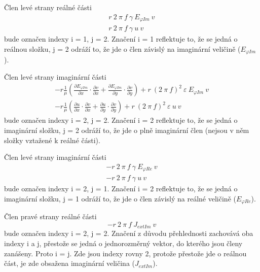 \documentclass[12pt,a4paper,oneside]{article}
\numberwithin{equation}{section} %
\numberwithin{figure}{section} %
\numberwithin{table}{section} %
\begin{document}
Člen levé strany reálné části
\begin{subequations}
\begin{gather}
r ~ 2 ~ \pi ~ f ~ \gamma ~ E _{\varphi Im} ~ v
\\
r ~ 2 ~ \pi ~ f ~ \gamma ~ u ~ v
\end{gather}
\end{subequations}
bude označen indexy i = 1, j = 2. Značení i = 1 reflektuje to, že se jedná o reálnou složku, j = 2 odráží to, že jde o člen závislý na imaginární veličině ($E _{\varphi Im}$).


Člen levé strany imaginární části
\begin{subequations}
\begin{gather}
- r \frac{1}{\mu} \left( \frac{\partial E _{\varphi Im}}{\partial x} \cdot \frac{\partial v}{\partial x} + \frac{\partial E _{\varphi Im}}{\partial y} \cdot \frac{\partial v}{\partial y} \right) + r ~ (2 ~ \pi ~ f) ^2 ~ \varepsilon ~ E _{\varphi Im} ~ v
\\
- r \frac{1}{\mu} \left( \frac{\partial u}{\partial x} \cdot \frac{\partial v}{\partial x} + \frac{\partial u}{\partial y} \cdot \frac{\partial v}{\partial y} \right) + r ~ (2 ~ \pi ~ f) ^2 ~ \varepsilon ~ u ~ v
\end{gather}
\end{subequations}
bude označen indexy i = 2, j = 2. Značení i = 2 reflektuje to, že se jedná o imaginární složku, j = 2 odráží to, že jde o plně imaginární člen (nejsou v něm složky vztažené k reálné části). 

Člen levé strany imaginární části
\begin{subequations}
\begin{gather}
- r ~ 2 ~ \pi ~ f ~ \gamma ~ E _{\varphi Re} ~ v
\\
- r ~ 2 ~ \pi ~ f ~ \gamma ~ u ~ v
\end{gather}
\end{subequations}
bude označen indexy i = 2, j = 1. Značení i = 2 reflektuje to, že se jedná o imaginární složku, j = 1 odráží to, že jde o člen závislý na reálné veličině ($E _{\varphi Re}$).

Člen pravé strany reálné části
\begin{equation}
- r ~ 2 ~ \pi ~ f ~ J _{extIm} ~ v
\end{equation}
bude označen indexy i = 2, j = 2. Značení z důvodu přehlednosti zachovává oba indexy i a j, přestože se jedná o jednorozměrný vektor, do kterého jsou členy zanášeny. Proto i = j. Zde jsou indexy rovny 2, protože přestože jde o reálnou část, je zde obsažena imaginární veličina ($J _{extIm}$).
\end{document}
